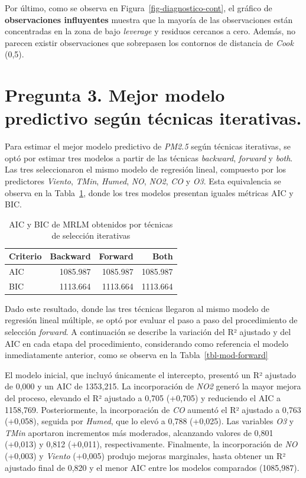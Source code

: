 \documentclass[
  spanish,
  letterpaper,
  DIV=11,
  numbers=noendperiod]{scrartcl}
\begin{document}
Por último, como se observa en Figura~\ref{fig-diagnostico-cont}, el
gráfico de \textbf{observaciones influyentes} muestra que la mayoría de
las observaciones están concentradas en la zona de bajo \emph{leverage}
y residuos cercanos a cero. Además, no parecen existir observaciones que
sobrepasen los contornos de distancia de \emph{Cook} (0,5).

\section{Pregunta 3. Mejor modelo predictivo según técnicas
iterativas.}\label{pregunta-3.-mejor-modelo-predictivo-seguxfan-tuxe9cnicas-iterativas.}

Para estimar el mejor modelo predictivo de \emph{PM2.5} según técnicas
iterativas, se optó por estimar tres modelos a partir de las técnicas
\emph{backward}, \emph{forward} y \emph{both}. Las tres seleccionaron el
mismo modelo de regresión lineal, compuesto por los predictores
\emph{Viento}, \emph{TMin}, \emph{Humed}, \emph{NO}, \emph{NO2},
\emph{CO} y \emph{O3}. Esta equivalencia se observa en la
Tabla~\ref{tbl-aic-bic}, donde los tres modelos presentan iguales
métricas AIC y BIC.

{

\begin{longtable}[]{@{}lrrr@{}}

\caption{\label{tbl-aic-bic}AIC y BIC de MRLM obtenidos por técnicas de
selección iterativas}

\tabularnewline

\toprule\noalign{}
Criterio & Backward & Forward & Both \\
\midrule\noalign{}
\endhead
\bottomrule\noalign{}
\endlastfoot
AIC & 1085.987 & 1085.987 & 1085.987 \\
BIC & 1113.664 & 1113.664 & 1113.664 \\

\end{longtable}

}

Dado este resultado, donde las tres técnicas llegaron al mismo modelo de
regresión lineal múltiple, se optó por evaluar el paso a paso del
procedimiento de selección \emph{forward}. A continuación se describe la
variación del R² ajustado y del AIC en cada etapa del procedimiento,
considerando como referencia el modelo inmediatamente anterior, como se
observa en la Tabla~\ref{tbl-mod-forward}

El modelo inicial, que incluyó únicamente el intercepto, presentó un R²
ajustado de 0,000 y un AIC de 1353,215. La incorporación de \emph{NO2}
generó la mayor mejora del proceso, elevando el R² ajustado a 0,705
(+0,705) y reduciendo el AIC a 1158,769. Posteriormente, la
incorporación de \emph{CO} aumentó el R² ajustado a 0,763 (+0,058),
seguida por \emph{Humed}, que lo elevó a 0,788 (+0,025). Las variables
\emph{O3} y \emph{TMin} aportaron incrementos más moderados, alcanzando
valores de 0,801 (+0,013) y 0,812 (+0,011), respectivamente. Finalmente,
la incorporación de \emph{NO} (+0,003) y \emph{Viento} (+0,005) produjo
mejoras marginales, hasta obtener un R² ajustado final de 0,820 y el
menor AIC entre los modelos comparados (1085,987).
\end{document}
